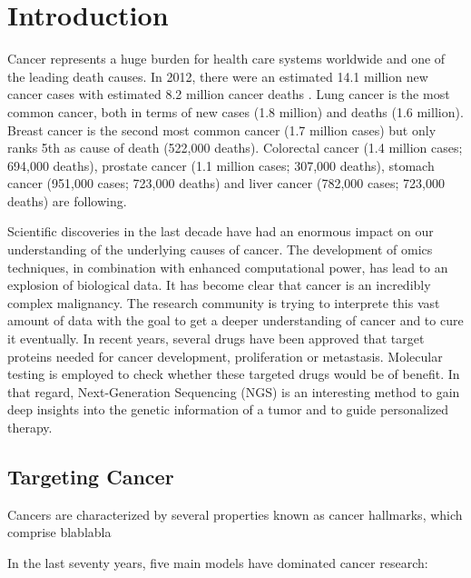 \section{Introduction}

  Cancer represents a huge burden for health care systems worldwide and one of
  the leading death causes. In 2012, there were an estimated 14.1 million new
  cancer cases with estimated  8.2 million cancer deaths
  {\cite{cancer_stats_worldwide:2012}}. Lung cancer is the most common cancer,
  both in terms of new cases (1.8 million) and deaths (1.6 million). Breast
  cancer is the second most common cancer (1.7 million cases) but only ranks 5th
  as cause of death (522,000 deaths). Colorectal cancer (1.4 million cases;
  694,000 deaths), prostate cancer (1.1 million cases; 307,000 deaths), stomach
  cancer (951,000 cases; 723,000 deaths) and liver cancer (782,000 cases;
  723,000 deaths) are following.

  Scientific discoveries in the last decade have had an enormous impact on our
  understanding of the underlying causes of cancer. The development of omics
  techniques, in combination with enhanced computational power, has lead to an
  explosion of biological data. It has become clear that cancer is an incredibly
  complex malignancy. The research community is trying to interprete this vast
  amount of data with the goal to get a deeper understanding of cancer and to
  cure it eventually. In recent years, several drugs have been approved that
  target proteins needed for cancer development, proliferation or metastasis.
  Molecular testing is employed to check whether these targeted drugs would be
  of benefit. In that regard, Next-Generation Sequencing (NGS) is an interesting
  method to gain deep insights into the genetic information of a tumor and to
  guide personalized therapy.

  \subsection{Targeting Cancer}

    Cancers are characterized by several properties known as cancer hallmarks, which
    comprise blablabla

    In the last seventy years, five main models have dominated cancer research:

